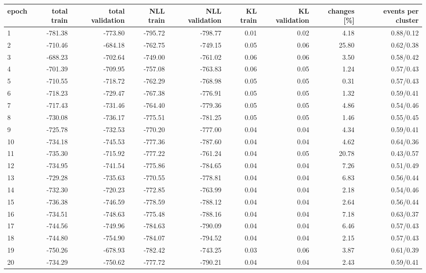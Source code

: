 \begin{tabular}{lrrrrrrrr}
\hline
epoch & total train & total validation & NLL train & NLL validation & KL train & KL validation & changes [\%] & events per cluster \\
\hline
1 & -781.38 & -773.80 & -795.72 & -798.77 & 0.01 & 0.02 & 4.18 & 0.88/0.12 \\
2 & -710.46 & -684.18 & -762.75 & -749.15 & 0.05 & 0.06 & 25.80 & 0.62/0.38 \\
3 & -688.23 & -702.64 & -749.00 & -761.02 & 0.06 & 0.06 & 3.50 & 0.58/0.42 \\
4 & -701.39 & -709.95 & -757.08 & -763.83 & 0.06 & 0.05 & 1.24 & 0.57/0.43 \\
5 & -710.55 & -718.72 & -762.29 & -768.98 & 0.05 & 0.05 & 0.31 & 0.57/0.43 \\
6 & -718.23 & -729.47 & -767.38 & -776.91 & 0.05 & 0.05 & 1.32 & 0.59/0.41 \\
7 & -717.43 & -731.46 & -764.40 & -779.36 & 0.05 & 0.05 & 4.86 & 0.54/0.46 \\
8 & -730.08 & -736.17 & -775.51 & -781.25 & 0.05 & 0.05 & 1.46 & 0.55/0.45 \\
9 & -725.78 & -732.53 & -770.20 & -777.00 & 0.04 & 0.04 & 4.34 & 0.59/0.41 \\
10 & -734.18 & -745.53 & -777.36 & -787.60 & 0.04 & 0.04 & 4.62 & 0.64/0.36 \\
11 & -735.30 & -715.92 & -777.22 & -761.24 & 0.04 & 0.05 & 20.78 & 0.43/0.57 \\
12 & -734.95 & -741.54 & -775.86 & -784.65 & 0.04 & 0.04 & 7.26 & 0.51/0.49 \\
13 & -729.28 & -735.63 & -770.55 & -778.81 & 0.04 & 0.04 & 6.83 & 0.56/0.44 \\
14 & -732.30 & -720.23 & -772.85 & -763.99 & 0.04 & 0.04 & 2.18 & 0.54/0.46 \\
15 & -736.38 & -746.59 & -778.59 & -788.12 & 0.04 & 0.04 & 2.64 & 0.56/0.44 \\
16 & -734.51 & -748.63 & -775.48 & -788.16 & 0.04 & 0.04 & 7.18 & 0.63/0.37 \\
17 & -744.56 & -749.96 & -784.63 & -790.09 & 0.04 & 0.04 & 6.46 & 0.57/0.43 \\
18 & -744.80 & -754.90 & -784.07 & -794.52 & 0.04 & 0.04 & 2.15 & 0.57/0.43 \\
19 & -750.26 & -678.93 & -782.42 & -743.25 & 0.03 & 0.06 & 3.87 & 0.61/0.39 \\
20 & -734.29 & -750.62 & -777.72 & -790.21 & 0.04 & 0.04 & 2.43 & 0.59/0.41 \\

\end{tabular}
